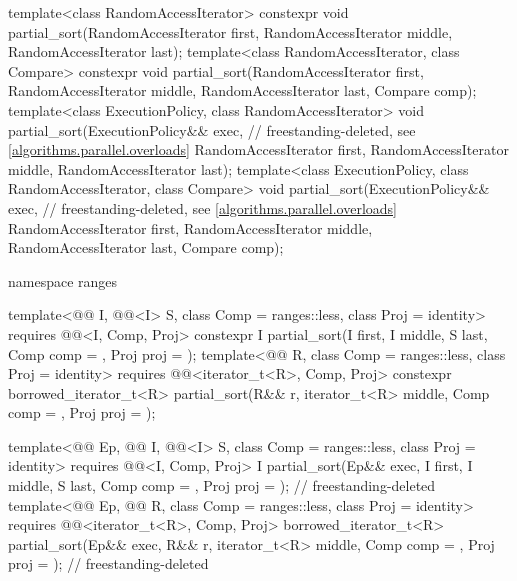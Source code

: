 \begin{codeblock}
{  template<class RandomAccessIterator>
    constexpr void partial_sort(RandomAccessIterator first, RandomAccessIterator middle,
                                RandomAccessIterator last);
  template<class RandomAccessIterator, class Compare>
    constexpr void partial_sort(RandomAccessIterator first, RandomAccessIterator middle,
                                RandomAccessIterator last, Compare comp);
  template<class ExecutionPolicy, class RandomAccessIterator>
    void partial_sort(ExecutionPolicy&& exec,                   // freestanding-deleted, see \ref{algorithms.parallel.overloads}
                      RandomAccessIterator first, RandomAccessIterator middle,
                      RandomAccessIterator last);
  template<class ExecutionPolicy, class RandomAccessIterator, class Compare>
    void partial_sort(ExecutionPolicy&& exec,                   // freestanding-deleted, see \ref{algorithms.parallel.overloads}
                      RandomAccessIterator first, RandomAccessIterator middle,
                      RandomAccessIterator last, Compare comp);

  namespace ranges {
    template<@@ I, @@<I> S, class Comp = ranges::less,
             class Proj = identity>
      requires @@<I, Comp, Proj>
      constexpr I
        partial_sort(I first, I middle, S last, Comp comp = {}, Proj proj = {});
    template<@@ R, class Comp = ranges::less, class Proj = identity>
      requires @@<iterator_t<R>, Comp, Proj>
      constexpr borrowed_iterator_t<R>
        partial_sort(R&& r, iterator_t<R> middle, Comp comp = {},
                     Proj proj = {});

    template<@@ Ep, @@ I, @@<I> S,
             class Comp = ranges::less, class Proj = identity>
      requires @@<I, Comp, Proj>
      I partial_sort(Ep&& exec, I first, I middle, S last, Comp comp = {},
                     Proj proj = {});                           // freestanding-deleted
    template<@@ Ep, @@ R,
             class Comp = ranges::less, class Proj = identity>
      requires @@<iterator_t<R>, Comp, Proj>
      borrowed_iterator_t<R>
        partial_sort(Ep&& exec, R&& r, iterator_t<R> middle, Comp comp = {},
                     Proj proj = {});                           // freestanding-deleted
  }

}
\end{codeblock}
